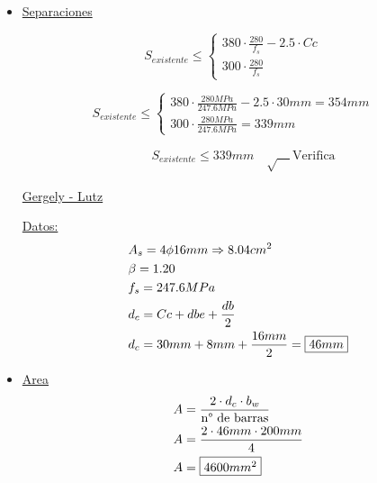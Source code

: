 \begin{enumerate}
\begin{itemize}
\item \underline{Separaciones}

\[ S_{existente} \leq \left\{ \begin{array}{ll}
         380 \cdot \frac{280}{f_s} - 2.5 \cdot Cc & \\
         300 \cdot \frac{280}{f_s} & \end{array} \right. \]

\[ S_{existente} \leq \left\{ \begin{array}{ll}
         380 \cdot \frac{280MPa}{247.6MPa} - 2.5 \cdot 30mm = 354mm & \\
         300 \cdot \frac{280MPa}{247.6MPa} = 339mm & \end{array} \right. \]

\begin{align*}
& S_{existente} \leq 339mm \quad \surd \quad \text{Verifica}
\end{align*}

\begin{center}
\underline{\Large{Gergely - Lutz}}
\end{center}

\underline{Datos:}\\
\begin{align*}
& A_s = 4 \phi 16mm \Rightarrow 8.04 cm^2\\
& \beta = 1.20 \\
& f_s = 247.6MPa \\
& d_c = Cc + dbe + \frac{db}{2} \\
& d_c = 30mm + 8mm + \frac{16mm}{2} = \framebox{$46mm$}
\end{align*}

\item \underline{Area}
\begin{align*}
& A = \frac{2 \cdot d_c \cdot b_w}{\text{n° de barras}} \\
& A = \frac{2 \cdot 46mm \cdot 200mm}{4} \\
& A = \framebox{$4600mm^2$}
\end{align*}


\end{itemize}
\end{enumerate}
